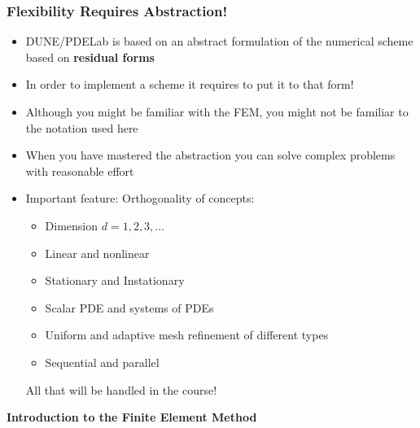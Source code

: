 \documentclass[ignorenonframetext,11pt]{beamer}
\theoremstyle{definition}
\begin{document}
\begin{frame}
\frametitle{Flexibility Requires Abstraction!}
\begin{itemize}
\item DUNE/PDELab is based on an abstract formulation of the numerical scheme
based on \textbf{residual forms}
\item In order to implement a scheme it requires to put it to that form!
\item Although you might be familiar with the FEM, you might not
be familiar to the notation used here
\item When you have mastered the abstraction you can solve complex problems with
reasonable effort
\item Important feature: Orthogonality of concepts:
\begin{itemize}
\item Dimension $d=1,2,3,\ldots$
\item Linear and nonlinear
\item Stationary and Instationary
\item Scalar PDE and systems of PDEs
\item Uniform and adaptive mesh refinement of different types
\item Sequential and parallel
\end{itemize}
All that will be handled in the course!
\end{itemize}
\end{frame}

\begin{frame}
\begin{center}
\Large\textbf{Introduction to the Finite Element Method}
\end{center}
\end{frame}

\end{document}
